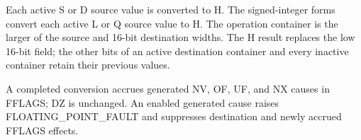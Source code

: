 Each active S or D source value is converted to H. The signed-integer forms
convert each active L or Q source value to H. The operation container is the
larger of the source and 16-bit destination widths. The H result replaces the
low 16-bit field; the other bits of an active destination container and every
inactive container retain their previous values.

A completed conversion accrues generated NV, OF, UF, and NX causes in FFLAGS;
DZ is unchanged. An enabled generated cause raises FLOATING\_POINT\_FAULT and
suppresses destination and newly accrued FFLAGS effects.

